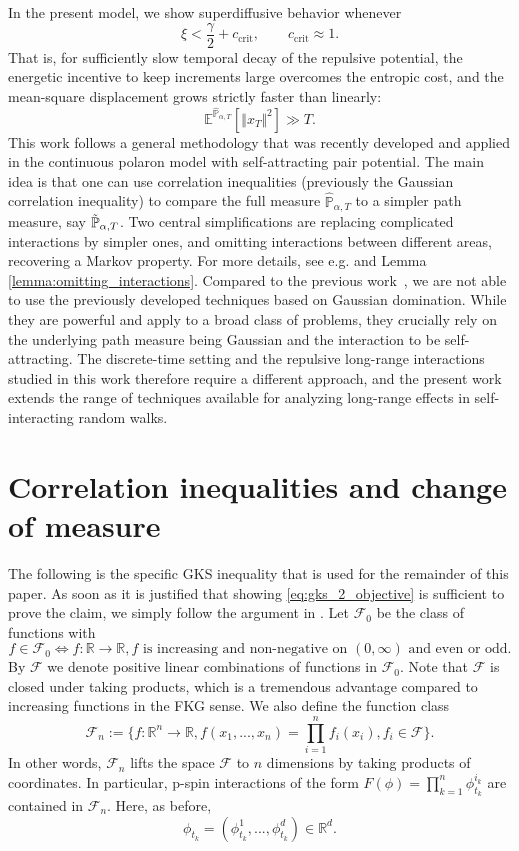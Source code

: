 \documentclass[reqno,11pt]{amsart}
\newcommand{\1}{\mathds{1}}
\theoremstyle{plain}
\theoremstyle{definition}
\numberwithin{equation}{section}
\newcommand{\caF}{{\mathcal F}}
\newcommand{\bbE}{{\mathbb E}}
\newcommand{\bbP}{{\mathbb P}}
\newcommand{\bbR}{{\mathbb R}}
\newcommand{\bbPh}{\hat{\bbP}}
\newcommand{\bbPw}{\Tilde{\bbP}}
\begin{document}
In the present model, we show superdiffusive behavior whenever
\[
   \xi < \frac{\gamma}{2} + c_{\mathrm{crit}}, \qquad c_{\mathrm{crit}}\approx 1.
\]
That is, for sufficiently slow temporal decay of the repulsive potential, the energetic incentive to keep increments large overcomes the entropic cost, and the mean-square displacement grows strictly faster than linearly:
\[
    \bbE^{\bbPh_{\alpha,T}}[ \Vert x_T\Vert ^2] \gg T.
\]
This work follows a general methodology that was recently developed and applied in the continuous polaron model with self-attracting pair potential. The main idea is that one can use correlation inequalities (previously the Gaussian correlation inequality) to compare the full measure $\bbPh_{\alpha,T}$ to a simpler path measure, say $\bbPw_{\alpha,T}$. Two central simplifications are replacing complicated interactions by simpler ones, and omitting interactions between different areas, recovering a Markov property. For more details, see e.g. \cite[Corollary 2.2]{Se24} and Lemma \ref{lemma:omitting_interactions}.
Compared to the previous work~\cite{BeSchSe25b}, we are not able to use the previously developed techniques based on Gaussian domination. While they are powerful and apply to a broad class of problems, they crucially rely on the underlying path measure being Gaussian and the interaction to be self-attracting.
The discrete-time setting and the repulsive long-range interactions studied in this work therefore require a different approach, and the present work extends the range of techniques available for analyzing long-range effects in self-interacting random walks.

\section{Correlation inequalities and change of measure}
The following is the specific GKS inequality that is used for the remainder of this paper. As soon as it is justified that showing \eqref{eq:gks_2_objective} is sufficient to prove the claim, we simply follow the argument in \cite{simon79}.
Let $\caF_0$ be the class of functions with 
$$f \in \caF_0 \iff f: \bbR \rightarrow \bbR, f  \text{ is increasing and non-negative on $(0,\infty)$ and even or odd.}$$
By $\caF$ we denote positive linear combinations of functions in $\caF_0$. Note that $\caF$ is closed under taking products, which is a tremendous advantage compared to increasing functions in the FKG sense. We also define the function class
$$\caF_n := \Big\{ f : \bbR^n \to \bbR, f(x_1,...,x_n) = \prod\limits_{i=1} ^n f_i (x_i), f_i \in \caF \Big\}.$$
In other words, $\caF_n$ lifts the space $\caF$ to $n$ dimensions by taking products of coordinates. 
In particular, p-spin interactions of the form
$F(\phi) = \prod_{k=1} ^n \phi_{t_k} ^{i_k}$
are contained in $\caF_n$. Here, as before,
$$\phi_{t_k} = (\phi_{t_k} ^1,...,\phi_{t_k}^d) \in \bbR^d.$$
\end{document}
